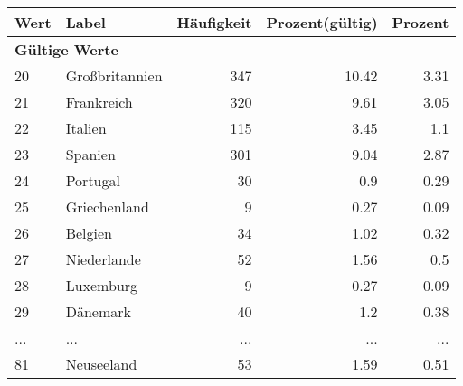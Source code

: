      \begin{longtable}{lXrrr}
     \toprule
     \textbf{Wert} & \textbf{Label} & \textbf{Häufigkeit} & \textbf{Prozent(gültig)} & \textbf{Prozent} \\
     \endhead
     \midrule
     \multicolumn{5}{l}{\textbf{Gültige Werte}}\\
        20 & \multicolumn{1}{X}{Großbritannien} & %
          \num{347} &
          \num[round-mode=places,round-precision=2]{10,42} &
          \num[round-mode=places,round-precision=2]{3,31} \\
        21 & \multicolumn{1}{X}{Frankreich} & %
          \num{320} &
          \num[round-mode=places,round-precision=2]{9,61} &
          \num[round-mode=places,round-precision=2]{3,05} \\
        22 & \multicolumn{1}{X}{Italien} & %
          \num{115} &
          \num[round-mode=places,round-precision=2]{3,45} &
          \num[round-mode=places,round-precision=2]{1,1} \\
        23 & \multicolumn{1}{X}{Spanien} & %
          \num{301} &
          \num[round-mode=places,round-precision=2]{9,04} &
          \num[round-mode=places,round-precision=2]{2,87} \\
        24 & \multicolumn{1}{X}{Portugal} & %
          \num{30} &
          \num[round-mode=places,round-precision=2]{0,9} &
          \num[round-mode=places,round-precision=2]{0,29} \\
        25 & \multicolumn{1}{X}{Griechenland} & %
          \num{9} &
          \num[round-mode=places,round-precision=2]{0,27} &
          \num[round-mode=places,round-precision=2]{0,09} \\
        26 & \multicolumn{1}{X}{Belgien} & %
          \num{34} &
          \num[round-mode=places,round-precision=2]{1,02} &
          \num[round-mode=places,round-precision=2]{0,32} \\
        27 & \multicolumn{1}{X}{Niederlande} & %
          \num{52} &
          \num[round-mode=places,round-precision=2]{1,56} &
          \num[round-mode=places,round-precision=2]{0,5} \\
        28 & \multicolumn{1}{X}{Luxemburg} & %
          \num{9} &
          \num[round-mode=places,round-precision=2]{0,27} &
          \num[round-mode=places,round-precision=2]{0,09} \\
        29 & \multicolumn{1}{X}{Dänemark} & %
          \num{40} &
          \num[round-mode=places,round-precision=2]{1,2} &
          \num[round-mode=places,round-precision=2]{0,38} \\
       ... & ... & ... & ... & ... \\
        81 & \multicolumn{1}{X}{Neuseeland} & %
          \num{53} &
          \num[round-mode=places,round-precision=2]{1,59} &
          \num[round-mode=places,round-precision=2]{0,51} \\


\end{longtable}
